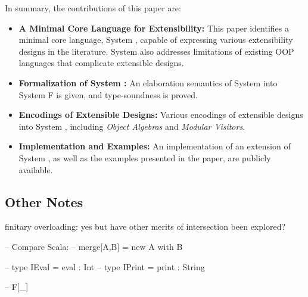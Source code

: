 In summary, the contributions of this paper are:

\begin{itemize}

\item {\bf A Minimal Core Language for Extensibility:} This paper
  identifies a minimal core language, System \name, capable of
  expressing various extensibility designs in the literature.
  System \name also addresses limitations of existing OOP
  languages that complicate extensible designs. 
  
\item {\bf Formalization of System \name:} An elaboration semantics of
  System \name into System F is given, and type-soundness is proved.

\item {\bf Encodings of Extensible Designs:} Various encodings of
  extensible designs into System \name, including \emph{Object
    Algebras} and \emph{Modular Visitors}. 

\item {\bf Implementation and Examples:} An implementation of an
  extension of System \name, as well as the examples presented in the
  paper, are publicly available. 

\begin{comment}

\item{elaboration typing rules which given a source expression with intersection
    types, typecheck and translate it into an ordinary F term. Prove a type
    preservation result: if a term $ e $ has type $ \ty $ in the source language,
    then the translated term $ \image e $ is well-typed and has type $ \image \ty $ in the
    target language.}

\item{present an algorithm for detecting incoherence which can be very important
    in practice.}

\item{explores the connection between intersection types and object algebra by
    showing various examples of encoding object algebra with intersection
    types.}

\end{comment}

\end{itemize}

\subsection{Other Notes}

finitary overloading: yes
but have other merits of intersection been explored?

-- Compare Scala:
-- merge[A,B] = new A with B

-- type IEval  = { eval :  Int }
-- type IPrint = { print : String }

-- F[\_]
